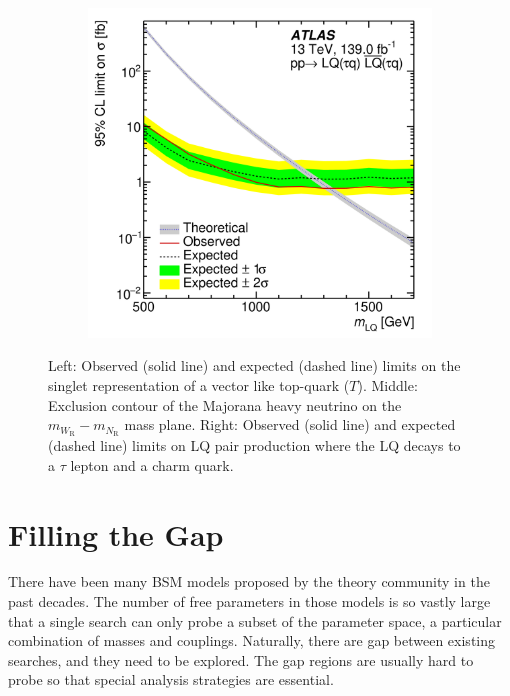 \documentclass{moriond}
\begin{document}
\begin{figure}[htp]
\begin{subfigure}[b]{0.25\textwidth}
         \centering
         \includegraphics[width=\textwidth]{excited}
         \label{fig:excited}
     \end{subfigure}
     \caption{Left: Observed (solid line) and expected (dashed line) limits on the singlet representation of a vector like top-quark ($T$)\protect\cite{vlq}. Middle: Exclusion contour of the Majorana heavy neutrino on the $m_{W_{\mathrm{R}}}-m_{N_{\mathrm{R}}}$ mass plane\protect\cite{rhn}. Right: Observed (solid line) and expected (dashed line) limits on LQ pair production where the LQ decays to a $\tau$ lepton and a charm quark\protect\cite{tau}.}
     \label{fig:limits1}
\end{figure}

\section{Filling the Gap}

There have been many BSM models proposed by the theory community in the past
decades. The number of free parameters in those models is so vastly large that
a single search can only probe a subset of the parameter space, a particular
combination of masses and couplings. Naturally, there are gap between existing
searches, and they need to be explored. The gap regions are usually hard to
probe so that special analysis strategies are essential.\\
\end{document}
